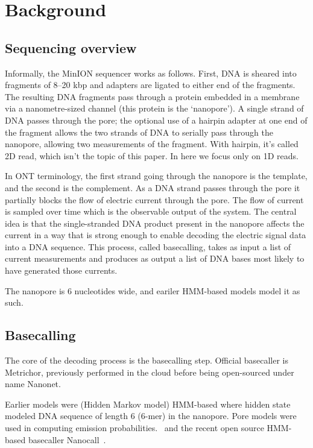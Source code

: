 \documentclass[times, utf8, seminar, numeric]{fer}
\begin{document}
\chapter{Background}

\section{Sequencing overview}
Informally, the MinION sequencer works as follows. First, DNA is sheared into fragments of 8–20 kbp and adapters are ligated to either end of the fragments. The resulting DNA fragments pass through a protein embedded in a membrane via a nanometre-sized channel (this protein is the `nanopore'). A single strand of DNA passes through the pore; the optional use of a hairpin adapter at one end of the fragment allows the two strands of DNA to serially pass through the nanopore, allowing two measurements of the fragment. With hairpin, it's called 2D read, which isn't the topic of this paper. In here we focus only on 1D reads.

In ONT terminology, the first strand going through the nanopore is the template, and the second is the complement. As a DNA strand passes through the pore it partially blocks the flow of electric current through the pore. The flow of current is sampled over time which is the observable output of the system. The central idea is that the single-stranded DNA product present in the nanopore affects the current in a way that is strong enough to enable decoding the electric signal data into a DNA sequence. This process, called basecalling, takes as input a list of current measurements and produces as output a list of DNA bases most likely to have generated those currents.

The nanopore is 6 nucleotides wide, and eariler HMM-based models model it as such.

\section{Basecalling}

The core of the decoding process is the basecalling step. Official basecaller is Metrichor, previously performed in the cloud before being open-sourced under name Nanonet.

Earlier models were (Hidden Markov model) HMM-based where hidden state modeled DNA sequence of length 6 (6-mer) in the nanopore. Pore models were used in computing emission probabilities.~\cite{loman2015complete,schreiber2015analysis,szalay2015novo,timp2012dna} and the recent open source HMM-based basecaller Nanocall~\cite{david2016nanocall}.
\end{document}
